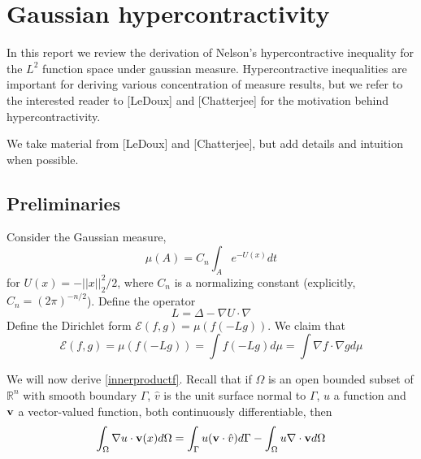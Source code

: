 \documentclass[11pt]{article}
\begin{document}
\newcommand{\tr}{\text{tr}}
\newcommand{\E}{\textbf{E}}
\newcommand{\diag}{\text{diag}}
\newcommand{\argmax}{\text{argmax}}
\newcommand{\Cov}{\text{Cov}}
\pagestyle{fancy}

\section{Gaussian hypercontractivity}

In this report we review the derivation of Nelson's hypercontractive
inequality for the $L^2$ function space under gaussian measure.
Hypercontractive inequalities are important for deriving
various concentration of measure results, but we refer to the
interested reader to [LeDoux] and [Chatterjee] for the motivation
behind hypercontractivity.

We take material from [LeDoux] and [Chatterjee], but add details and
intuition when possible.

\subsection{Preliminaries}

Consider the Gaussian measure,
\[ \mu(A) = C_n \int_A e^{-U(x)} dt \]
for $U(x) = -||x||_2^2/2$, where $C_n$ is a normalizing constant
(explicitly, $C_n = (2\pi)^{-n/2}$).
Define the operator
\[
L = \Delta - \nabla U \cdot \nabla
\]
Define the Dirichlet form $\mathcal{E}(f,g) = \mu(f(-Lg))$.
We claim that
\begin{equation}\label{innerproductf}
\mathcal{E}(f,g) =\mu(f(-Lg))=\int f(-Lg) d\mu = \int \nabla f \cdot \nabla g d \mu
\end{equation}

We will now derive \eqref{innerproductf}. Recall that if $\Omega$ is an open
bounded subset of $\mathbb{R}^n$ with smooth boundary $\Gamma$,
$\hat{v}$ is the unit surface normal to $\Gamma$, $u$ a
function and ${\bf v}$ a vector-valued function, both continuously
differentiable,  then
\begin{equation}\label{intparts}
\int_\Omega \nabla u \cdot {\bf v}(x) d\Omega = \int_\Gamma u({\bf
  v}\cdot \hat{v}) d\Gamma-\int_\Omega
u \nabla \cdot {\bf v} d\Omega
\end{equation}
\end{document}
